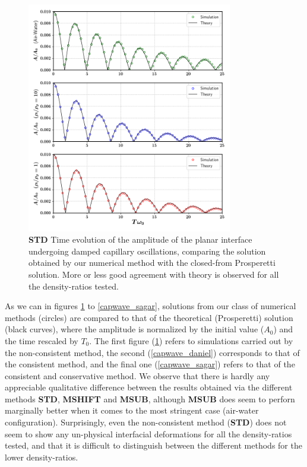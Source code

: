 \begin{figure}[h!]
    \centering
    \includegraphics[width = 0.8\textwidth]{plots/capwave/compare_nonmc.png}
	\caption{\textbf{STD} Time evolution of the amplitude of the planar interface undergoing damped capillary oscillations, comparing the solution obtained by our numerical method with the closed-from Prosperetti solution. More or less good agreement with theory is observed for all the density-ratios tested. }
    \label{capwave_nonmc}
\end{figure}

As we can in figures \ref{capwave_nonmc} to \ref{capwave_sagar}, solutions from our class of numerical methods (circles) are compared to that of the theoretical (Prosperetti) solution (black curves), where the amplitude is normalized by the initial value ($A_0$) and the time rescaled by $T_0$. The first figure (\ref{capwave_nonmc}) refers to simulations carried out by the non-consistent method, the second (\ref{capwave_daniel}) corresponds to that of the consistent method, and the final one (\ref{capwave_sagar}) refers to that of the consistent and conservative method. We observe that there is hardly any appreciable qualitative difference between the results obtained via the different methods \textbf{STD}, \textbf{MSHIFT} and \textbf{MSUB}, although \textbf{MSUB} does seem to perforn marginally better when it comes to the most stringent case (air-water configuration). Surprisingly, even the non-consistent method (\textbf{STD}) does not seem to show any un-physical interfacial deformations for all the density-ratios tested, and that it is difficult to distinguish between the different methods for the lower density-ratios.  

